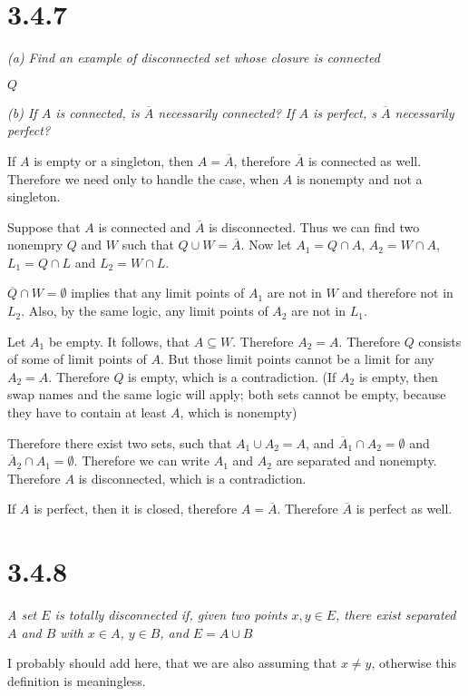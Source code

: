 \documentclass[11pt,oneside,titlepage]{book}
\begin{document}
\section*{3.4.7}
\textit{(a) Find an example of disconnected set whose closure is connected}

$Q$

\textit{(b) If $A$ is connected, is $\overline A$ necessarily connected? If
  $A$ is perfect, s $\overline A$ necessarily perfect?}

If $A$ is empty or a singleton, then $A = \overline A$, therefore $\overline
A$ is connected as well. Therefore we need only to handle the case, when
$A$ is nonempty and not a singleton.

Suppose that $A$ is connected and $\overline A$ is disconnected. Thus we can
find two nonempry $Q$ and $W$ such that $Q \cup W = \overline A$.
Now let $A_1 = Q \cap A$, $A_2 = W \cap A$, $L_1 = Q \cap L$ and
$L_2 = W \cap L$.

$\overline Q \cap W = \emptyset$ implies that any limit points of $A_1$ are
not in $W$ and therefore not in $L_2$.
Also, by the same logic, any limit points of $A_2$ are not in $L_1$.

Let $A_1$ be empty. It follows, that $A \subseteq W$. Therefore $A_2 = A$.
Therefore $Q$ consists
of some of  limit points of $A$. But those limit points cannot be a limit
for any $A_2 = A$. Therefore $Q$ is empty, which is a contradiction.
(If $A_2$ is empty, then swap names and the same logic will apply; both
sets cannot be empty, because they have to contain at least $A$, which is
nonempty)

Therefore there exist two sets, such that $A_1 \cup A_2 = A$, and
$\overline A_1 \cap A_2 = \emptyset$ and $\overline A_2 \cap A_1 = \emptyset$.
Therefore we can write $A_1$ and $A_2$ are separated and nonempty.
Therefore $A$ is disconnected, which is a contradiction.


If $A$ is perfect, then it is closed, therefore $A = \overline A$. Therefore
$\overline A$ is perfect as well.

\section*{3.4.8}
\textit{A set $E$ is totally disconnected if, given two points $x, y \in E$,
  there exist separated $A$ and $B$  with $x \in A$, $y \in B$, and
  $E = A \cup B$}

I probably should add here, that we are also assuming that $x \neq y$,
otherwise this definition is meaningless.
\end{document}
